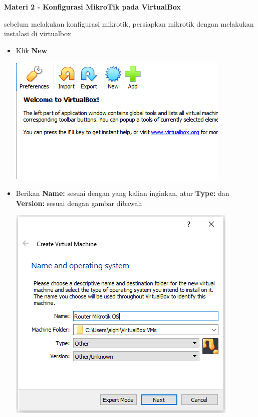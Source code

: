 \documentclass{article}
\begin{document}
	\newpage
    \begin{flushleft}
        \textbf{Materi 2 - Konfigurasi MikroTik pada VirtualBox}
        \newline

        sebelum melakukan konfigurasi mikrotik, persiapkan mikrotik dengan melakukan instalasi di virtualbox \\
        
        \begin{itemize}
        	
        	\item Klik \textbf{New} \\
        		\begin{center}
        			\includegraphics[scale=0.6]{virtualbox}
        		\end{center}
        		
        	\item Berikan \textbf{Name:} sesuai dengan yang kalian inginkan, atur \textbf{Type:} dan \textbf{Version:} sesuai dengan gambar dibawah\\
        		\begin{center}
        			\includegraphics[scale=0.6]{(2)}
        		\end{center}
        	

\end{itemize}
\end{flushleft}
\end{document}
